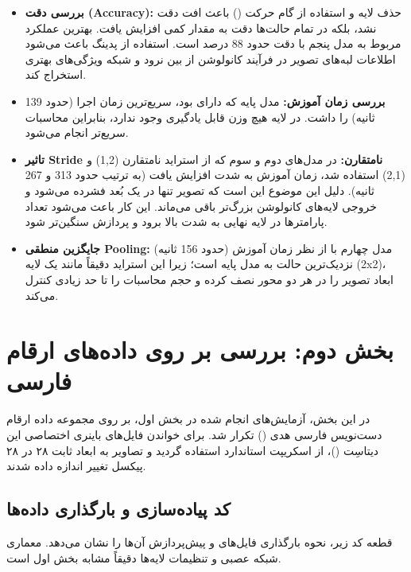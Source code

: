\documentclass[12pt, a4paper]{article}
\begin{document}
	\begin{itemize}
		\item \textbf{بررسی دقت (Accuracy):} حذف لایه  و استفاده از گام حرکت
		() باعث افت دقت نشد، بلکه در تمام حالت‌ها دقت به مقدار کمی
		افزایش یافت. بهترین عملکرد مربوط به مدل پنجم با دقت حدود 88 درصد است. استفاده از پدینگ  باعث می‌شود اطلاعات لبه‌های تصویر در فرآیند کانولوشن
		از بین نرود و شبکه ویژگی‌های بهتری استخراج کند.
		
		\item \textbf{بررسی زمان آموزش:} مدل پایه که دارای  بود، سریع‌ترین
		زمان اجرا (حدود 139 ثانیه) را داشت. در لایه  هیچ وزن قابل یادگیری
		وجود ندارد، بنابراین محاسبات سریع‌تر انجام می‌شود.
		
		\item \textbf{تاثیر Stride نامتقارن:} در مدل‌های دوم و سوم که از استراید
		نامتقارن (1,2) و (2,1) استفاده شد، زمان آموزش به شدت افزایش یافت (به ترتیب
		حدود 313 و 267 ثانیه). دلیل این موضوع این است که تصویر تنها در یک بُعد فشرده
		می‌شود و خروجی لایه‌های کانولوشن بزرگ‌تر باقی می‌ماند. این کار باعث می‌شود
		تعداد پارامترها در لایه  نهایی به شدت بالا برود و پردازش سنگین‌تر
		شود.
		
		\item \textbf{جایگزین منطقی Pooling:} مدل چهارم با  از نظر زمان
		آموزش (حدود 156 ثانیه) نزدیک‌ترین حالت به مدل پایه است؛ زیرا این استراید دقیقاً
		مانند یک لایه  (2x2)، ابعاد تصویر را در هر دو محور نصف کرده و حجم
		محاسبات را تا حد زیادی کنترل می‌کند.
	\end{itemize}
	
	\pagebreak
	
	\section{بخش دوم: بررسی بر روی داده‌های ارقام فارسی}
	در این بخش، آزمایش‌های انجام شده در بخش اول، بر روی مجموعه داده ارقام دست‌نویس
	فارسی هدی () تکرار شد. برای خواندن فایل‌های باینری اختصاصی این
	دیتاسِت ()، از اسکریپت استاندارد  استفاده گردید
	و تصاویر به ابعاد ثابت ۲۸ در ۲۸ پیکسل تغییر اندازه داده شدند.
	
	\subsection{کد پیاده‌سازی و بارگذاری داده‌ها}
	قطعه کد زیر، نحوه بارگذاری فایل‌های  و پیش‌پردازش آن‌ها را نشان می‌دهد.
	معماری شبکه عصبی و تنظیمات لایه‌ها دقیقاً مشابه بخش اول است.
	
\end{document}
